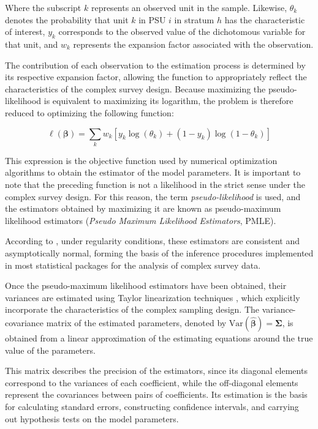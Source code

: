 \documentclass[
  english,
  12pt,
]{book}
\begin{document}
Where the subscript \(k\) represents an observed unit in the sample. Likewise, \(\theta_{k}\) denotes the probability that unit \(k\) in PSU \(i\) in stratum \(h\) has the characteristic of interest, \(y_{k}\) corresponds to the observed value of the dichotomous variable for that unit, and \(w_{k}\) represents the expansion factor associated with the observation.

The contribution of each observation to the estimation process is determined by its respective expansion factor, allowing the function to appropriately reflect the characteristics of the complex survey design. Because maximizing the pseudo-likelihood is equivalent to maximizing its logarithm, the problem is therefore reduced to optimizing the following function:

\[
\ell(\boldsymbol{\beta})
=
\sum_{k}
w_{k}
\left[
y_{k}\log(\theta_{k})
+
(1-y_{k})
\log(1-\theta_{k})
\right]
\]

This expression is the objective function used by numerical optimization algorithms to obtain the estimator of the model parameters. It is important to note that the preceding function is not a likelihood in the strict sense under the complex survey design. For this reason, the term \emph{pseudo-likelihood} is used, and the estimators obtained by maximizing it are known as pseudo-maximum likelihood estimators (\emph{Pseudo Maximum Likelihood Estimators}, PMLE).

According to \citet{molina1992pseudo}, under regularity conditions, these estimators are consistent and asymptotically normal, forming the basis of the inference procedures implemented in most statistical packages for the analysis of complex survey data.

Once the pseudo-maximum likelihood estimators have been obtained, their variances are estimated using Taylor linearization techniques \citep{binder1983variances}, which explicitly incorporate the characteristics of the complex sampling design. The variance-covariance matrix of the estimated parameters, denoted by \(\text{Var}(\hat{\boldsymbol{\beta}})=\boldsymbol{\Sigma}\), is obtained from a linear approximation of the estimating equations around the true value of the parameters.

This matrix describes the precision of the estimators, since its diagonal elements correspond to the variances of each coefficient, while the off-diagonal elements represent the covariances between pairs of coefficients. Its estimation is the basis for calculating standard errors, constructing confidence intervals, and carrying out hypothesis tests on the model parameters.
\end{document}
